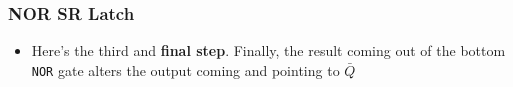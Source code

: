 \documentclass{beamer}
\begin{document}
   		\begin{frame}
   			\frametitle{NOR SR Latch}
   			\begin{itemize}
   				\item Here's the third and \textbf{final step}. Finally, the result coming out of the bottom \texttt{NOR} gate alters the output coming and pointing to $\bar{Q}$
   			\end{itemize}
   			
   			{
   			\centering
   			


\begin{tikzpicture}[x=0.75pt,y=0.75pt,yscale=-1,xscale=1]


\end{tikzpicture}}
\end{frame}
\end{document}
